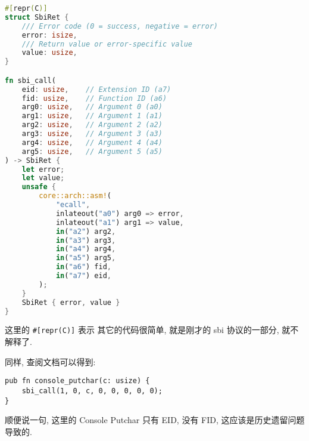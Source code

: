 \documentclass[a4paper]{ctexart}
\begin{document}
\begin{lstlisting}[language=rust]
#[repr(C)]
struct SbiRet {
    /// Error code (0 = success, negative = error)
    error: isize,
    /// Return value or error-specific value
    value: usize,
}

fn sbi_call(
    eid: usize,    // Extension ID (a7)
    fid: usize,    // Function ID (a6)
    arg0: usize,   // Argument 0 (a0)
    arg1: usize,   // Argument 1 (a1)
    arg2: usize,   // Argument 2 (a2)
    arg3: usize,   // Argument 3 (a3)
    arg4: usize,   // Argument 4 (a4)
    arg5: usize,   // Argument 5 (a5)
) -> SbiRet {
    let error;
    let value;
    unsafe {
        core::arch::asm!(
            "ecall",
            inlateout("a0") arg0 => error,
            inlateout("a1") arg1 => value,
            in("a2") arg2,
            in("a3") arg3,
            in("a4") arg4,
            in("a5") arg5,
            in("a6") fid,
            in("a7") eid,
        );
    }
    SbiRet { error, value }
}
\end{lstlisting}
这里的 \verb|#[repr(C)]| 表示
其它的代码很简单, 就是刚才的 sbi 协议的一部分,
就不解释了.

同样, 查阅文档可以得到:
\begin{lstlisting}
pub fn console_putchar(c: usize) {
    sbi_call(1, 0, c, 0, 0, 0, 0, 0);
}
\end{lstlisting}
顺便说一句, 这里的 Console Putchar 只有 EID,
没有 FID, 这应该是历史遗留问题导致的.







\end{document}

